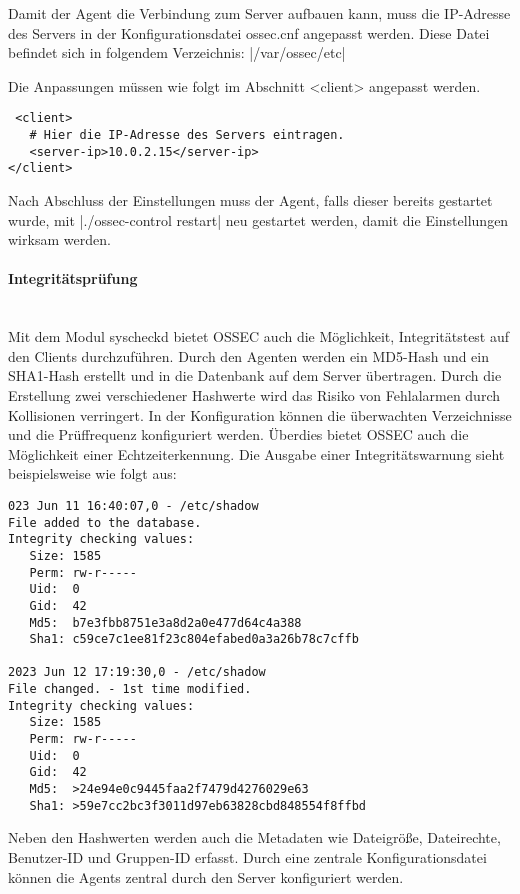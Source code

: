 \noindent Damit der Agent die Verbindung zum Server aufbauen kann, muss die IP-Adresse des Servers in der Konfigurationsdatei ossec.cnf angepasst werden. Diese Datei befindet sich in folgendem Verzeichnis: |/var/ossec/etc| 

\noindent Die Anpassungen müssen wie folgt im Abschnitt <client> angepasst werden.   
\begin{verbatim}
 <client>
   # Hier die IP-Adresse des Servers eintragen.
   <server-ip>10.0.2.15</server-ip> 
</client>
\end{verbatim}

\noindent Nach Abschluss der Einstellungen muss der Agent, falls dieser bereits gestartet wurde, mit |./ossec-control restart| neu gestartet werden, damit die Einstellungen wirksam werden.

\paragraph{Integritätsprüfung}
\noindent \\Mit dem Modul syscheckd bietet OSSEC auch die Möglichkeit, Integritätstest auf den Clients durchzuführen. Durch den Agenten werden ein MD5-Hash und ein SHA1-Hash erstellt und in die Datenbank auf dem Server übertragen. Durch die Erstellung zwei verschiedener Hashwerte wird das Risiko von Fehlalarmen durch Kollisionen verringert. In der Konfiguration können die überwachten Verzeichnisse und die Prüffrequenz konfiguriert werden. Überdies bietet OSSEC auch die Möglichkeit einer Echtzeiterkennung. Die Ausgabe einer Integritätswarnung sieht beispielsweise wie folgt aus:
\begin{verbatim}
023 Jun 11 16:40:07,0 - /etc/shadow
File added to the database. 
Integrity checking values:
   Size: 1585
   Perm: rw-r-----
   Uid:  0
   Gid:  42
   Md5:  b7e3fbb8751e3a8d2a0e477d64c4a388
   Sha1: c59ce7c1ee81f23c804efabed0a3a26b78c7cffb

2023 Jun 12 17:19:30,0 - /etc/shadow
File changed. - 1st time modified.
Integrity checking values:
   Size: 1585
   Perm: rw-r-----
   Uid:  0
   Gid:  42
   Md5:  >24e94e0c9445faa2f7479d4276029e63
   Sha1: >59e7cc2bc3f3011d97eb63828cbd848554f8ffbd
\end{verbatim}

\noindent Neben den Hashwerten werden auch die Metadaten wie Dateigröße, Dateirechte, Benutzer-ID und Gruppen-ID erfasst. Durch eine zentrale Konfigurationsdatei können die Agents zentral durch den Server konfiguriert werden. 

